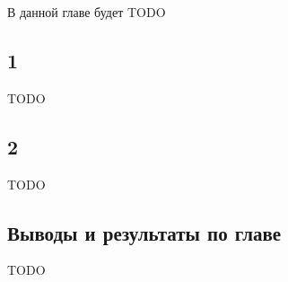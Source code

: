 \documentclass[../diploma.tex]{subfiles}
\begin{document}
\label{sec:1}

В данной главе будет TODO

\subsection{1}

TODO

\subsection{2}

TODO

\subsection{Выводы и результаты по главе}

TODO
\end{document}

